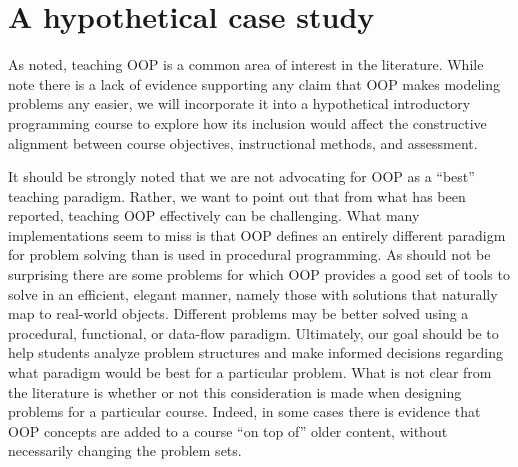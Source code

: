 \documentclass[12pt]{article}
\begin{document}
\section{A hypothetical case study}
As noted, teaching OOP is a common area of interest in the
literature. While \citeauthor{robins_learning_2003} note there is a
lack of evidence supporting any claim that OOP makes modeling problems
any easier\autocite{robins_learning_2003}, we will incorporate it into
a hypothetical introductory programming course to explore how its
inclusion would affect the constructive alignment between course
objectives, instructional methods, and assessment.

It should be strongly noted that we are not advocating for OOP as a
``best'' teaching paradigm. Rather, we want to point out that from
what has been reported, teaching OOP effectively can be
challenging. What many implementations seem to miss is that OOP
defines an entirely different paradigm for problem solving than is
used in procedural programming\autocite{kolling_problem_1999}. As
should not be surprising there are some problems for which OOP
provides a good set of tools to solve in an efficient, elegant manner,
namely those with solutions that naturally map to real-world
objects\autocite{raymond_art_2003}. Different problems may be better
solved using a procedural, functional, or data-flow
paradigm\autocite{kay_history_1996,felleisen_functional_2009,crestani_experience_2010}. Ultimately,
our goal should be to help students analyze problem structures and
make informed decisions regarding what paradigm would be best for a
particular problem. What is not clear from the literature is whether
or not this consideration is made when designing problems for a
particular course. Indeed, in some cases there is evidence that OOP
concepts are added to a course ``on top of'' older content, without
necessarily changing the problem
sets\autocite{kolling_problem_1999,vilner_fundamental_2007}.
\end{document}
